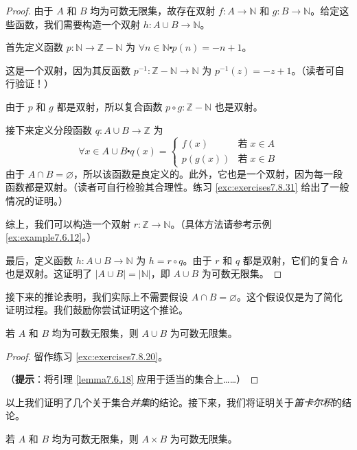 \begin{proof}
    由于 $A$ 和 $B$ 均为可数无限集，故存在双射 $f : A \to \mathbb{N}$ 和 $g : B \to \mathbb{N}$。给定这些函数，我们需要构造一个双射 $h : A \cup B \to \mathbb{N}$。

    首先定义函数 $p : \mathbb{N} \to \mathbb{Z} - \mathbb{N}$ 为 $\forall n \in \mathbb{N} \centerdot p(n) = -n + 1$。

    这是一个双射，因为其反函数 $p^{-1} : \mathbb{Z} - \mathbb{N} \to \mathbb{N}$ 为 $p^{-1}(z) = -z + 1$。（读者可自行验证！）

    由于 $p$ 和 $g$ 都是双射，所以复合函数 $p \circ g : \mathbb{Z} - \mathbb{N}$ 也是双射。

    接下来定义分段函数 $q : A \cup B \to \mathbb{Z}$ 为
    \[\forall x \in A \cup B \centerdot q(x) = \begin{cases}
            f(x)    & \text{若}\; x \in A \\
            p(g(x)) & \text{若}\; x \in B
        \end{cases}\]
    由于 $A \cap B = \varnothing$，所以该函数是良定义的。此外，它也是一个双射，因为每一段函数都是双射。（读者可自行检验其合理性。练习 \ref{exc:exercises7.8.31} 给出了一般情况的证明。）

    综上，我们可以构造一个双射 $r : \mathbb{Z} \to \mathbb{N}$。（具体方法请参考示例 \ref{ex:example7.6.12}。）

    最后，定义函数 $h : A \cup B \to \mathbb{N}$ 为 $h = r \circ q$。由于 $r$ 和 $q$ 都是双射，它们的复合 $h$ 也是双射。这证明了 $|A \cup B| = |\mathbb{N}|$，即 $A \cup B$ 为可数无限集。
\end{proof}

接下来的推论表明，我们实际上不需要假设 $A \cap B = \varnothing$。这个假设仅是为了简化证明过程。我们鼓励你尝试证明这个推论。

\begin{corollary}\label{corollary7.6.19}
    若 $A$ 和 $B$ 均为可数无限集，则 $A \cup B$ 为可数无限集。
\end{corollary}

\begin{proof}
    留作练习 \ref{exc:exercises7.8.20}。

    （\textbf{提示}：将引理 \ref{lemma7.6.18} 应用于适当的集合上……）
\end{proof}

以上我们证明了几个关于集合\emph{并集}的结论。接下来，我们将证明关于\emph{笛卡尔积}的结论。

\begin{theorem}
    若 $A$ 和 $B$ 均为可数无限集，则 $A \times B$ 为可数无限集。
\end{theorem}

